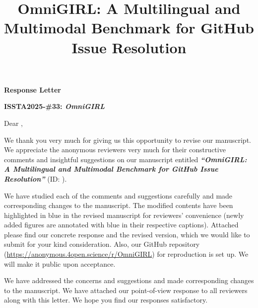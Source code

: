 \documentclass[12pt,american]{article}
\title{OmniGIRL: A Multilingual and Multimodal Benchmark for
GitHub Issue Resolution}
\begin{document}

% 
\thispagestyle{empty}

\begin{center}
    \textbf{\large Response Letter}

    
    \textbf{\large  {ISSTA2025-\#33: \emph{OmniGIRL}}}
\end{center}

\vspace{1em} 

\noindent Dear \editorname,

We thank you very much for giving us this opportunity to revise our manuscript. We appreciate the anonymous reviewers very much for their constructive comments and insightful suggestions on our manuscript entitled \emph{\textbf{``OmniGIRL: A Multilingual and Multimodal Benchmark for GitHub Issue Resolution''}} (ID: \manuscript).

We have studied each of the comments and suggestions carefully and made corresponding changes to the manuscript. The modified contents have been highlighted in blue in the revised manuscript for reviewers' convenience (newly added figures are annotated with blue in their respective captions). Attached please find our concrete response and the revised version, which we would like to submit for your kind consideration. Also, our GitHub repository (\url{https://anonymous.4open.science/r/OmniGIRL}) for reproduction is set up. We will make it public upon acceptance.

We have addressed the concerns and suggestions and made corresponding changes to the manuscript. We have attached our point-of-view response to all reviewers along with this letter. We hope you find our responses satisfactory.

\vspace{8em}
\end{document}
